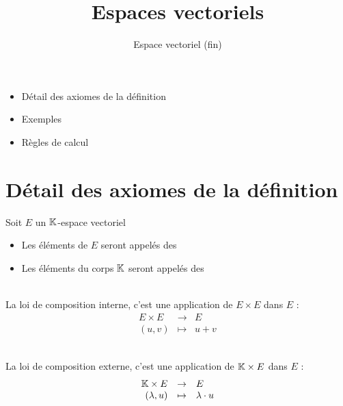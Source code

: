 







\title{{\bf Espaces vectoriels}}
\subtitle{Espace vectoriel (fin)}

\begin{frame}
  
  \debutmontitre

  \pause

{\footnotesize
\hfill
{}
\begin{minipage}{0.6\textwidth}
  \begin{itemize}
    \item<3-> Détail des axiomes de la définition
    \item<4-> Exemples
    \item<5-> Règles de calcul    
  \end{itemize}
\end{minipage}
}

\end{frame}

\setcounter{framenumber}{0}


\section{Détail des axiomes de la définition}

\begin{frame}


Soit $E$ un $\mathbb{K}$-espace vectoriel
\begin{itemize}
  \item Les éléments de $E$ seront appelés des 
  \item Les éléments du corps $\mathbb{K}$ seront appelés des 
\end{itemize}

\pause
\bigskip

 \\
La loi de composition interne, c'est une application de $E \times E$ dans $E$ :
$$\begin{array}{rcl}
E \times E & \to & E\\
(u, v) & \mapsto & u+v
\end{array}$$

\pause
\bigskip
{} \\
La loi de composition externe, 
 c'est une application de $\mathbb{K} \times E$ dans $E$ : 
$$\begin{array}{rcl}
\mathbb{K} \times E & \to & E\\
(\lambda, u ) & \mapsto & \lambda \cdot u 
\end{array}$$

\end{frame}


